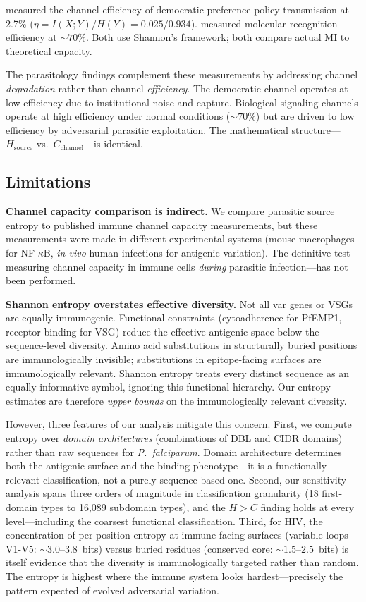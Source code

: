 \documentclass[twocolumn,10pt]{article}
\begin{document}
\citet{lopin2026} measured the channel efficiency of democratic preference-policy transmission at 2.7\% ($\eta = I(X;Y)/H(Y) = 0.025/0.934$).  \citet{schneider2000} measured molecular recognition efficiency at ${\sim}70\%$.  Both use Shannon's framework; both compare actual MI to theoretical capacity.

The parasitology findings complement these measurements by addressing channel \emph{degradation} rather than channel \emph{efficiency}.  The democratic channel operates at low efficiency due to institutional noise and capture.  Biological signaling channels operate at high efficiency under normal conditions (${\sim}70\%$) but are driven to low efficiency by adversarial parasitic exploitation.  The mathematical structure---$H_{\text{source}}$ vs.\ $C_{\text{channel}}$---is identical.

\subsection{Limitations}

\textbf{Channel capacity comparison is indirect.}  We compare parasitic source entropy to published immune channel capacity measurements, but these measurements were made in different experimental systems (mouse macrophages for NF-$\kappa$B, \emph{in vivo} human infections for antigenic variation).  The definitive test---measuring channel capacity in immune cells \emph{during} parasitic infection---has not been performed.

\textbf{Shannon entropy overstates effective diversity.}  Not all var genes or VSGs are equally immunogenic.  Functional constraints (cytoadherence for PfEMP1, receptor binding for VSG) reduce the effective antigenic space below the sequence-level diversity.  Amino acid substitutions in structurally buried positions are immunologically invisible; substitutions in epitope-facing surfaces are immunologically relevant.  Shannon entropy treats every distinct sequence as an equally informative symbol, ignoring this functional hierarchy.  Our entropy estimates are therefore \emph{upper bounds} on the immunologically relevant diversity.

However, three features of our analysis mitigate this concern.  First, we compute entropy over \emph{domain architectures} (combinations of DBL and CIDR domains) rather than raw sequences for \textit{P.~falciparum}.  Domain architecture determines both the antigenic surface and the binding phenotype---it is a functionally relevant classification, not a purely sequence-based one.  Second, our sensitivity analysis spans three orders of magnitude in classification granularity (18 first-domain types to 16,089 subdomain types), and the $H > C$ finding holds at every level---including the coarsest functional classification.  Third, for HIV, the concentration of per-position entropy at immune-facing surfaces (variable loops V1-V5: ${\sim}3.0\text{--}3.8$~bits) versus buried residues (conserved core: ${\sim}1.5\text{--}2.5$~bits) is itself evidence that the diversity is immunologically targeted rather than random.  The entropy is highest where the immune system looks hardest---precisely the pattern expected of evolved adversarial variation.
\end{document}

